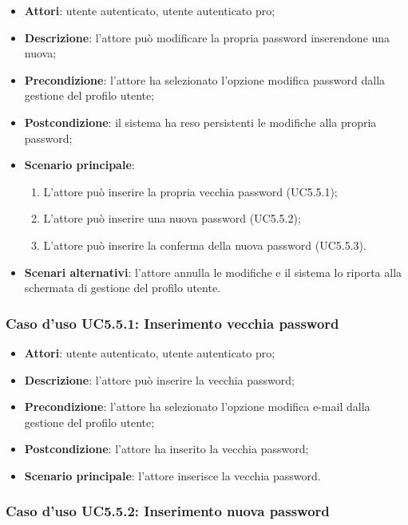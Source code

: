 \begin{itemize}
	\item \textbf{Attori}: utente autenticato, utente autenticato pro;
	\item \textbf{Descrizione}: l'attore può modificare la propria password inserendone una nuova;
	\item \textbf{Precondizione}:  l'attore ha selezionato l'opzione modifica password dalla gestione del profilo utente;
	\item \textbf{Postcondizione}: il sistema ha reso persistenti le modifiche alla propria password;
	\item \textbf{Scenario principale}:
	\begin{enumerate}
		\item L'attore può inserire la propria vecchia password (UC5.5.1);
		\item L'attore può inserire una nuova password (UC5.5.2);
		\item L'attore può inserire la conferma della nuova password (UC5.5.3).
	\end{enumerate}
	\item \textbf{Scenari alternativi}: l'attore annulla le modifiche e il sistema lo riporta alla schermata di gestione del profilo utente.
\end{itemize}

\subsubsection{Caso d'uso UC5.5.1: Inserimento vecchia password}

\begin{itemize}
	\item \textbf{Attori}: utente autenticato, utente autenticato pro;
	\item \textbf{Descrizione}: l'attore può inserire la vecchia password;
	\item \textbf{Precondizione}:  l'attore ha selezionato l'opzione modifica e-mail dalla gestione del profilo utente;
	\item \textbf{Postcondizione}: l'attore ha inserito la vecchia password;
	\item \textbf{Scenario principale}: l'attore inserisce la vecchia password.
\end{itemize}

\subsubsection{Caso d'uso UC5.5.2: Inserimento nuova password}

